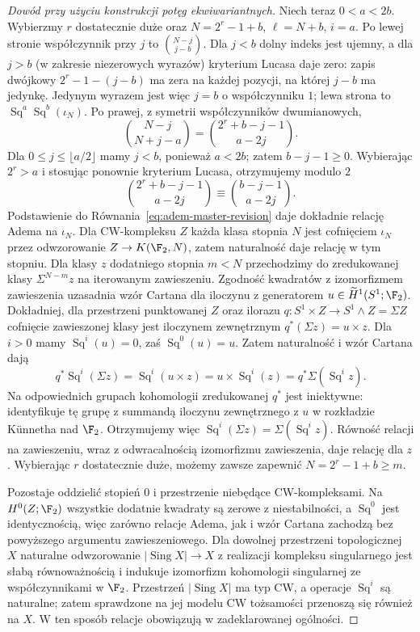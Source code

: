 \begin{proof}[Dowód przy użyciu konstrukcji potęg ekwiwariantnych]
Niech teraz $0<a<2b$. Wybierzmy $r$ dostatecznie
duże oraz $N=2^r-1+b$, $\ell=N+b$, $i=a$.
Po lewej stronie współczynnik przy $j$ to
$\binom{N-j}{j-b}$. Dla $j<b$ dolny indeks jest
ujemny, a dla $j>b$ (w zakresie niezerowych wyrazów)
kryterium Lucasa daje zero: zapis dwójkowy
$2^r-1-(j-b)$ ma zera na każdej pozycji, na której
$j-b$ ma jedynkę. Jedynym wyrazem jest więc
$j=b$ o współczynniku $1$; lewa strona to
$\operatorname{Sq}^a\operatorname{Sq}^b(\iota_N)$.
Po prawej, z symetrii współczynników dwumianowych,
\[
 \binom{N-j}{N+j-a}=
 \binom{2^r+b-j-1}{a-2j}.
\]
Dla $0\le j\le\lfloor a/2\rfloor$ mamy
$j<b$, ponieważ $a<2b$; zatem $b-j-1\ge0$.
Wybierając $2^r>a$ i stosując ponownie kryterium
Lucasa, otrzymujemy modulo $2$
\[
 \binom{2^r+b-j-1}{a-2j}
 \equiv\binom{b-j-1}{a-2j}.
\]
Podstawienie do
Równania~\ref{eq:adem-master-revision}
daje dokładnie relację Adema na $\iota_N$.
Dla CW-kompleksu $Z$ każda klasa stopnia $N$
jest cofnięciem $\iota_N$ przez odwzorowanie
$Z\to K(\F_2,N)$, zatem naturalność daje relację
w tym stopniu. Dla klasy $z$ dodatniego stopnia
$m<N$ przechodzimy do zredukowanej klasy
$\Sigma^{N-m}z$ na iterowanym zawieszeniu.
Zgodność kwadratów z izomorfizmem zawieszenia
uzasadnia wzór Cartana dla iloczynu z generatorem
$u\in\widetilde H^1(S^1;\F_2)$.
Dokładniej, dla przestrzeni punktowanej $Z$
oraz ilorazu $q:S^1\times Z\to S^1\wedge Z=\Sigma Z$
cofnięcie zawieszonej klasy jest iloczynem
zewnętrznym $q^*(\Sigma z)=u\times z$.
Dla $i>0$ mamy $\operatorname{Sq}^i(u)=0$,
zaś $\operatorname{Sq}^0(u)=u$. Zatem naturalność
i wzór Cartana dają
\[
 q^*\operatorname{Sq}^i(\Sigma z)
 =\operatorname{Sq}^i(u\times z)
 =u\times\operatorname{Sq}^i(z)
 =q^*\Sigma(\operatorname{Sq}^i z).
\]
Na odpowiednich grupach kohomologii zredukowanej
$q^*$ jest iniektywne: identyfikuje tę grupę
z summandą iloczynu zewnętrznego z $u$
w rozkładzie Künnetha nad $\F_2$.
Otrzymujemy więc
$\operatorname{Sq}^i(\Sigma z)=
\Sigma(\operatorname{Sq}^i z)$.
Równość relacji na zawieszeniu, wraz z
odwracalnością izomorfizmu zawieszenia,
daje relację dla $z$.
Wybierając $r$ dostatecznie duże, możemy zawsze
zapewnić $N=2^r-1+b\ge m$.

Pozostaje oddzielić stopień $0$ i przestrzenie
niebędące CW-kompleksami. Na $H^0(Z;\F_2)$
wszystkie dodatnie kwadraty są zerowe z
niestabilności, a $\operatorname{Sq}^0$ jest
identycznością, więc zarówno relacje Adema,
jak i wzór Cartana zachodzą bez powyższego
argumentu zawieszeniowego. Dla dowolnej
przestrzeni topologicznej $X$ naturalne odwzorowanie
$|\operatorname{Sing}X|\to X$ z realizacji
kompleksu singularnego jest słabą równoważnością
i indukuje izomorfizm kohomologii singularnej
ze współczynnikami w $\F_2$.
Przestrzeń $|\operatorname{Sing}X|$ ma typ CW,
a operacje $\operatorname{Sq}^i$ są naturalne;
zatem sprawdzone na jej modelu CW tożsamości
przenoszą się również na $X$.
W ten sposób relacje obowiązują w
zadeklarowanej ogólności.
\end{proof}
